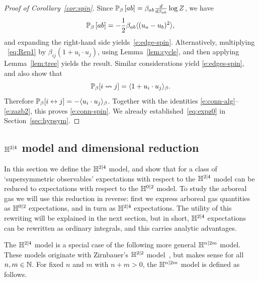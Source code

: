 \documentclass[11pt]{amsart}
\numberwithin{equation}{section}
\numberwithin{theorem}{section}
\newcommand{\cb}[1]{\left[#1\right ]} %
\newcommand{\ab}[1]{\langle #1 \rangle} %
\begin{document}
\begin{proof}[Proof of Corollary~\ref{cor:spin}]
Since $\P_\beta\cb{ab} = \beta_{ab}\frac{d}{d\beta_{ab}} \log Z$, we have
\begin{equation}
  \label{eq:edge-spin-pf}
  \P_\beta\cb{ab} = -\frac{1}{2}\beta_{ab}\ab{ (u_{a}-u_{b})^{2}},
\end{equation}
and expanding the right-hand side
yields~\eqref{e:edge-spin}. Alternatively, multiplying ~\eqref{eq:Rep1} by
$\beta_{ij}(1+u_i\cdot
u_j)$, using Lemma~\ref{lem:cycle}, and then applying
Lemma~\ref{lem:tree} yields the result. Similar considerations yield
\eqref{e:edges-spin}, and also show that
\begin{equation}
  \label{e:cspre}
  \mathbb{P}_{\beta}[i\nleftrightarrow j] = \langle 1+u_{i}\cdot u_{j} \rangle_{\beta}.
\end{equation}
%
Therefore  $\mathbb{P}_{\beta}[i\leftrightarrow j] = -\langle u_{i}\cdot u_{j} \rangle_{\beta}$.
Together with the identities \eqref{e:conn-alg}--\eqref{e:zazb2},
this proves \eqref{e:conn-spin}. We already established~\eqref{eq:expz0}
in Section~\ref{sec:hypsym}.
\end{proof}




\subsection{$\mathbb{H}^{2|4}$ model and dimensional reduction}
\label{sec:repr-h24}

In this section we define the $\mathbb{H}^{2|4}$ model, and show that for a
class of `supersymmetric observables' expectations with respect to the
$\mathbb{H}^{2|4}$ model can be reduced to expectations with respect to the
$\mathbb{H}^{0|2}$ model.  To study the arboreal gas we will use this
reduction in reverse: first we express arboreal gas quantities as
$\mathbb{H}^{0|2}$ expectations, and in turn as $\mathbb{H}^{2|4}$ expectations. The
utility of this rewriting will be explained in the next section, but in
short, $\mathbb{H}^{2|4}$ expectations can be rewritten as ordinary
integrals, and this carries analytic advantages.

The $\mathbb{H}^{2|4}$ model is a special case of the following more general
$\mathbb{H}^{n|2m}$ model. These models originate with Zirnbauer's $\mathbb{H}^{2|2}$
model~\cite{MR1411617,MR2728731}, but makes sense for all
$n ,m \in \mathbb{N}$.  For fixed $n$ and $m$ with $n+m>0$, the $\mathbb{H}^{n|2m}$
model is defined as follows.
\end{document}
